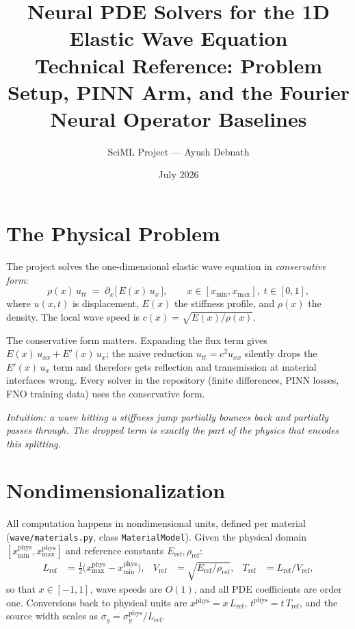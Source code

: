 \documentclass[11pt,a4paper]{article}
\title{\textbf{Neural PDE Solvers for the 1D Elastic Wave Equation}\\[4pt]
\large Technical Reference: Problem Setup, PINN Arm, and the Fourier Neural Operator Baselines}
\author{SciML Project --- Ayush Debnath}
\date{July 2026}
\newcommand{\intuition}[1]{\par\smallskip\noindent\textit{\color{inkgray}Intuition: #1}\par\smallskip}
\begin{document}
\maketitle
\tableofcontents
\newpage

\section{The Physical Problem}

The project solves the one-dimensional elastic wave equation in \emph{conservative form}:
\begin{equation}
  \rho(x)\, u_{tt} \;=\; \partial_x\!\bigl[\,E(x)\, u_x\,\bigr],
  \qquad x \in [x_{\min}, x_{\max}],\; t \in [0, 1],
  \label{eq:pde}
\end{equation}
where $u(x,t)$ is displacement, $E(x)$ the stiffness profile, and $\rho(x)$ the density.
The local wave speed is $c(x) = \sqrt{E(x)/\rho(x)}$.

The conservative form matters. Expanding the flux term gives
$E(x)\,u_{xx} + E'(x)\,u_x$; the naive reduction $u_{tt} = c^2 u_{xx}$
silently drops the $E'(x)\,u_x$ term and therefore gets reflection and
transmission at material interfaces wrong. Every solver in the repository
(finite differences, PINN losses, FNO training data) uses the conservative form.

\intuition{a wave hitting a stiffness jump partially bounces back and partially
passes through. The dropped term is exactly the part of the physics that
encodes this splitting.}

\section{Nondimensionalization}

All computation happens in nondimensional units, defined per material
(\texttt{wave/materials.py}, class \texttt{MaterialModel}). Given the physical
domain $[x^{\mathrm{phys}}_{\min}, x^{\mathrm{phys}}_{\max}]$ and reference
constants $E_{\mathrm{ref}}, \rho_{\mathrm{ref}}$:
\begin{align}
  L_{\mathrm{ref}} &= \tfrac{1}{2}\bigl(x^{\mathrm{phys}}_{\max}-x^{\mathrm{phys}}_{\min}\bigr), &
  V_{\mathrm{ref}} &= \sqrt{E_{\mathrm{ref}}/\rho_{\mathrm{ref}}}, &
  T_{\mathrm{ref}} &= L_{\mathrm{ref}} / V_{\mathrm{ref}},
\end{align}
so that $x \in [-1, 1]$, wave speeds are $O(1)$, and all PDE coefficients are
order one. Conversions back to physical units are
$x^{\mathrm{phys}} = x\,L_{\mathrm{ref}}$, $t^{\mathrm{phys}} = t\,T_{\mathrm{ref}}$,
and the source width scales as $\sigma_g = \sigma_g^{\mathrm{phys}} / L_{\mathrm{ref}}$.
\end{document}
